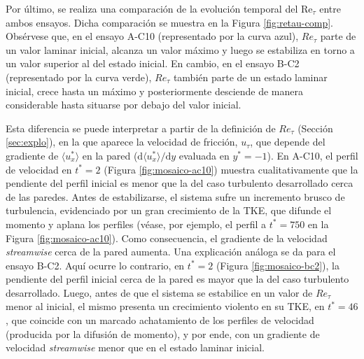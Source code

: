 Por último, se realiza una comparación de la evolución temporal del Re$_{\tau}$ entre ambos ensayos. Dicha comparación se muestra en la Figura \ref{fig:retau-comp}. Obsérvese que, en el ensayo A-C10 (representado por la curva azul), $Re_{\tau}$ parte de un valor laminar inicial, alcanza un valor máximo y luego se estabiliza en torno a un valor superior al del estado inicial. En cambio, en el ensayo B-C2 (representado por la curva verde), $Re_{\tau}$ también parte de un estado laminar inicial, crece hasta un máximo y posteriormente desciende de manera considerable hasta situarse por debajo del valor inicial.

Esta diferencia se puede interpretar a partir de la definición de $Re_{\tau}$ (Sección \ref{sec:explo}), en la que aparece la velocidad de fricción, $u_{\tau}$, que depende del gradiente de $\langle u^*_x  \rangle$ en la pared ($\mathrm{d}\langle u^*_x \rangle/\mathrm{d}y$ evaluada en $y^*=-1$). En A-C10, el perfil de velocidad en $t^*=2$ (Figura \ref{fig:mosaico-ac10}) muestra cualitativamente que la pendiente del perfil inicial es menor que la del caso turbulento desarrollado cerca de las paredes. Antes de estabilizarse, el sistema sufre un incremento brusco de turbulencia, evidenciado por un gran crecimiento de la TKE, que difunde el momento y aplana los perfiles (véase, por ejemplo, el perfil a $t^*=750$ en la Figura \ref{fig:mosaico-ac10}). Como consecuencia, el gradiente de la velocidad \textit{streamwise} cerca de la pared aumenta. Una explicación análoga se da para el ensayo B-C2. Aquí ocurre lo contrario, en $t^*=2$ (Figura \ref{fig:mosaico-bc2}), la pendiente del perfil inicial cerca de la pared es mayor que la del caso turbulento desarrollado. Luego, antes de que el sistema se estabilice en un valor de $Re_{\tau}$ menor al inicial, el mismo presenta un crecimiento violento en su TKE, en $t^*=46$, que coincide con un marcado achatamiento de los perfiles de velocidad (producida por la difusión de momento), y por ende, con un gradiente de velocidad \textit{streamwise} menor que en el estado laminar inicial.


